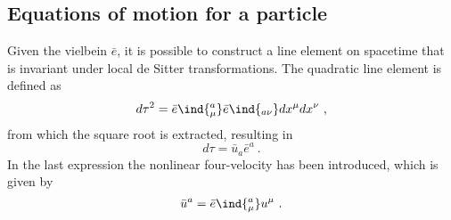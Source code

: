 \documentclass[11pt]{article}
\begin{document}
\subsection{Equations of motion for a particle}

Given the vielbein $\bar{e}$, it is possible to construct a line 
element on spacetime that is invariant under local de Sitter 
transformations.  The quadratic line element is defined as
\begin{displaymath}
	d\tau^2 = \bar{e}\ind{^a_\mu} \bar{e}\ind{_{a\nu}} dx^\mu 
	dx^\nu~,
\end{displaymath}
from which the square root is extracted, resulting in
\begin{equation}
	d\tau = \bar{u}_a \bar{e}^a~.
\end{equation}
In the last expression the nonlinear four-velocity has been 
introduced, which is given by
\begin{displaymath}
	\bar{u}^a = \bar{e}\ind{^a_\mu} u^\mu~.
\end{displaymath}
\end{document}
